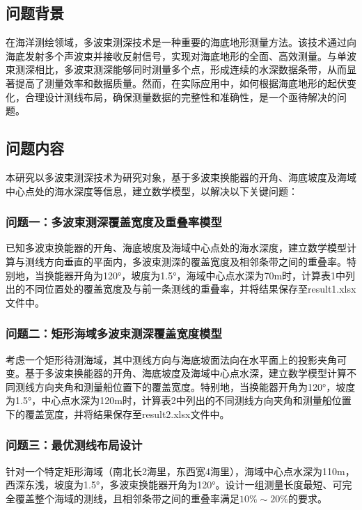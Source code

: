 \documentclass{cumcmthesis}
\begin{document}
\subsection{问题背景}

在海洋测绘领域，多波束测深技术是一种重要的海底地形测量方法。该技术通过向海底发射多个声波束并接收反射信号，实现对海底地形的全面、高效测量。与单波束测深相比，多波束测深能够同时测量多个点，形成连续的水深数据条带，从而显著提高了测量效率和数据质量。然而，在实际应用中，如何根据海底地形的起伏变化，合理设计测线布局，确保测量数据的完整性和准确性，是一个亟待解决的问题。
\subsection{问题内容}

本研究以多波束测深技术为研究对象，基于多波束换能器的开角、海底坡度及海域中心点处的海水深度等信息，建立数学模型，以解决以下关键问题：

\subsubsection{问题一：多波束测深覆盖宽度及重叠率模型}

已知多波束换能器的开角、海底坡度及海域中心点处的海水深度，建立数学模型计算与测线方向垂直的平面内，多波束测深的覆盖宽度及相邻条带之间的重叠率。特别地，当换能器开角为120°，坡度为1.5°，海域中心点水深为70m时，计算表1中列出的不同位置处的覆盖宽度及与前一条测线的重叠率，并将结果保存至result1.xlsx文件中。

\subsubsection{问题二：矩形海域多波束测深覆盖宽度模型}

考虑一个矩形待测海域，其中测线方向与海底坡面法向在水平面上的投影夹角可变。基于多波束换能器的开角、海底坡度及海域中心点水深，建立数学模型计算不同测线方向夹角和测量船位置下的覆盖宽度。特别地，当换能器开角为120°，坡度为1.5°，中心点水深为120m时，计算表2中列出的不同测线方向夹角和测量船位置下的覆盖宽度，并将结果保存至result2.xlsx文件中。

\subsubsection{问题三：最优测线布局设计}

针对一个特定矩形海域（南北长2海里，东西宽4海里），海域中心点水深为110m，西深东浅，坡度为1.5°，多波束换能器开角为120°。设计一组测量长度最短、可完全覆盖整个海域的测线，且相邻条带之间的重叠率满足$10\%\sim20\%$的要求。
\end{document}
